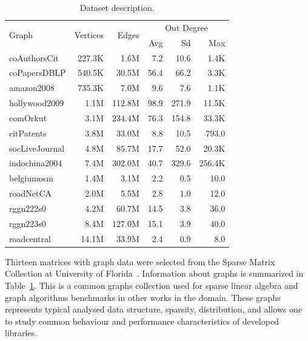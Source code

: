 \begin{table}[tbp]
\caption{Dataset description.} 
\begin{center}
    \begin{tabular}{|l|r|r|r|r|r|}
    \hline
    \multirow{2}{*}{Graph} & \multirow{2}{*}{Vertices} & \multirow{2}{*}{Edges} & \multicolumn{3}{c|}{Out Degree} \\ 
    \cline{4-6} & & & \multicolumn{1}{r|}{Avg} & \multicolumn{1}{r|}{Sd} & \multicolumn{1}{r|}{Max} \\
    \hline
    \hline
    \rowcolor{black!10} coAuthorsCit&227.3K&1.6M&7.2&10.6&1.4K\\
    \rowcolor{black!2 } coPapersDBLP&540.5K&30.5M&56.4&66.2&3.3K\\
    \rowcolor{black!10} amazon2008&735.3K&7.0M&9.6&7.6&1.1K\\
    \rowcolor{black!2 } hollywood2009&1.1M&112.8M&98.9&271.9&11.5K\\
    \rowcolor{black!10} comOrkut&3.1M&234.4M&76.3&154.8&33.3K\\
    \rowcolor{black!2 } citPatents&3.8M&33.0M&8.8&10.5&793.0\\
    \rowcolor{black!10} socLiveJournal&4.8M&85.7M&17.7&52.0&20.3K\\
    \rowcolor{black!2 } indochina2004&7.4M&302.0M&40.7&329.6&256.4K\\
    \hline
    \rowcolor{black!10} belgiumosm&1.4M&3.1M&2.2&0.5&10.0\\
    \rowcolor{black!2 } roadNetCA&2.0M&5.5M&2.8&1.0&12.0\\
    \rowcolor{black!10} rggn222s0&4.2M&60.7M&14.5&3.8&36.0\\
    \rowcolor{black!2 } rggn223s0&8.4M&127.0M&15.1&3.9&40.0\\
    \rowcolor{black!10} roadcentral&14.1M&33.9M&2.4&0.9&8.0\\
    \hline
    \end{tabular}
    \label{dataset:info}
\end{center}
\end{table}

Thirteen matrices with graph data were selected from the Sparse Matrix Collection at University of Florida~\cite{dataset:sparse_matrix_collection}. Information about graphs is summarized in Table~\ref{dataset:info}. This is a common graphs collection used for sparse linear algebra and graph algorithms benchmarks in other works in the domain. These graphs represents typical analysed data structure, sparsity, distribution, and allows one to study common behaviour and performance characteristics of developed libraries.

